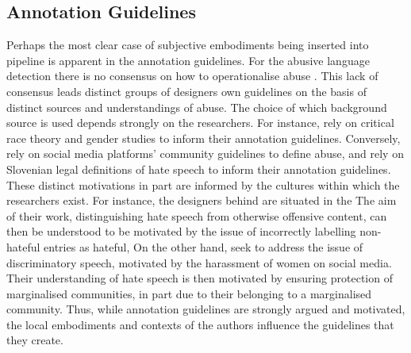 \subsection{Annotation Guidelines}
Perhaps the most clear case of subjective embodiments being inserted into pipeline is apparent in the annotation guidelines.
For the abusive language detection there is no consensus on how to operationalise abuse \citep{Waseem:2017}.
This lack of consensus leads distinct groups of designers  own guidelines on the basis of distinct sources and understandings of abuse.
The choice of which background source is used depends strongly on the researchers.
For instance, \citet{Waseem-Hovy:2016} rely on critical race theory and gender studies to inform their annotation guidelines.
Conversely, \citet{Davidson:2017} rely on social media platforms' community guidelines to define abuse, and \citet{Fiser:2017} rely on Slovenian legal definitions of hate speech to inform their annotation guidelines.
These distinct motivations in part are informed by the cultures within which the researchers exist.
For instance, the designers behind \citet{Davidson:2017} are situated in the 
The aim of their work, distinguishing hate speech from otherwise offensive content, can then be understood to be motivated by the issue of incorrectly labelling non-hateful entries as hateful, 
On the other hand, \citet{Waseem-Hovy:2016} seek to address the issue of discriminatory speech, motivated by the harassment of women on social media.
Their understanding of hate speech is then motivated by ensuring protection of marginalised communities, in part due to their belonging to a marginalised community.
Thus, while annotation guidelines are strongly argued and motivated, the local embodiments and contexts of the authors influence the guidelines that they create.

